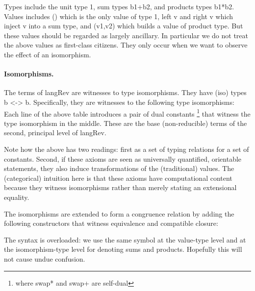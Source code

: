 \documentclass{llncs}
\begin{document}
Types include the unit type {{1}}, sum types {{b1+b2}}, and products types
{{b1*b2}}.  Values includes {{()}} which is the only value of type {{1}},
{{left v}} and {{right v}} which inject {{v}} into a sum type, and
{{(v1,v2)}} which builds a value of product type. But these values should be
regarded as largely ancillary.  In particular we do not treat the above
values as first-class citizens.  They only occur when we want to observe the
effect of an isomorphism.

\paragraph*{Isomorphisms.} The terms of {{langRev}} are witnesses to type
isomorphisms.  They have (iso) types {{b <-> b}}.  
Specifically, they are witnesses to the following type isomorphisms:
Each line of the above table introduces a pair of dual constants%
\footnote{where {{swap*}} and {{swap+}} are self-dual} that witness the type
isomorphism in the middle.  These are the base (non-reducible) terms of the
second, principal level of {{langRev}}.

Note how the above has two readings: first as a set of typing relations for a
set of constants. Second, if these axioms are seen as universally quantified,
orientable statements, they also induce transformations of the (traditional)
values.  The (categorical) intuition here is that these axioms have
computational content because they witness isomorphisms rather than merely
stating an extensional equality.

The isomorphisms are extended to form a congruence relation by adding the
following constructors that witness equivalence and compatible closure:
%
%
%

The syntax is overloaded: we use the same symbol at the value-type level
and at the isomorphism-type level for denoting sums and products.  Hopefully
this will not cause undue confusion.
\end{document}
